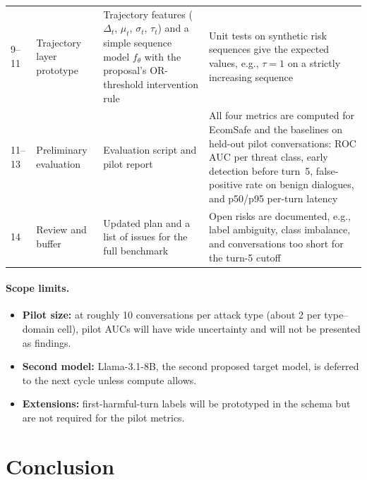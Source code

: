\documentclass[sigconf,nonacm]{acmart}
\begin{document}
\begin{table}[t]
\begin{tabular}{p{0.8cm}p{2.4cm}p{6.0cm}p{6.0cm}}
    9--11 & Trajectory layer prototype & Trajectory features ($\Delta_t$, $\mu_t$, $\sigma_t$, $\tau_t$) and a simple sequence model $f_\theta$ with the proposal's OR-threshold intervention rule & Unit tests on synthetic risk sequences give the expected values, e.g., $\tau = 1$ on a strictly increasing sequence \\
    11--13 & Preliminary evaluation & Evaluation script and pilot report & All four metrics are computed for EcomSafe and the baselines on held-out pilot conversations: ROC AUC per threat class, early detection before turn~5, false-positive rate on benign dialogues, and p50/p95 per-turn latency \\
    14 & Review and buffer & Updated plan and a list of issues for the full benchmark & Open risks are documented, e.g., label ambiguity, class imbalance, and conversations too short for the turn-5 cutoff \\
    \bottomrule
  \end{tabular}
\end{table}

\paragraph{Scope limits.}
\begin{itemize}
  \item \textbf{Pilot size:} at roughly 10 conversations per attack type (about 2 per type--domain cell), pilot AUCs will have wide uncertainty and will not be presented as findings.
  \item \textbf{Second model:} Llama-3.1-8B, the second proposed target model, is deferred to the next cycle unless compute allows.
  \item \textbf{Extensions:} first-harmful-turn labels will be prototyped in the schema but are not required for the pilot metrics.
\end{itemize}

\section{Conclusion}
\label{sec:conclusion}
\end{document}
